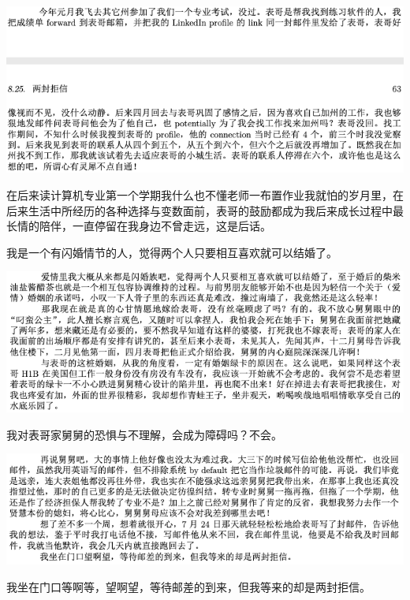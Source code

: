 \documentclass[9pt, b5paper]{article}
\begin{document}
\begin{center}
\includegraphics[width=.9\linewidth]{./pic/p1p63-1.png}
\end{center}

在后来读计算机专业第一个学期我什么也不懂老师一布置作业我就怕的岁月里，在后来生活中所经历的各种选择与变数面前，表哥的鼓励都成为我后来成长过程中最长情的陪伴，一直停留在我身边不曾走远，这是后话。

我是一个有闪婚情节的人，觉得两个人只要相互喜欢就可以结婚了。

\begin{center}
\includegraphics[width=.9\linewidth]{./pic/p1p63-2.png}
\end{center}

我对表哥家舅舅的恐惧与不理解，会成为障碍吗？不会。 

\begin{center}
\includegraphics[width=.9\linewidth]{./pic/p1p63-3.png}
\end{center}

我坐在门口等啊等，望啊望，等待邮差的到来，但我等来的却是两封拒信。 
\end{document}
